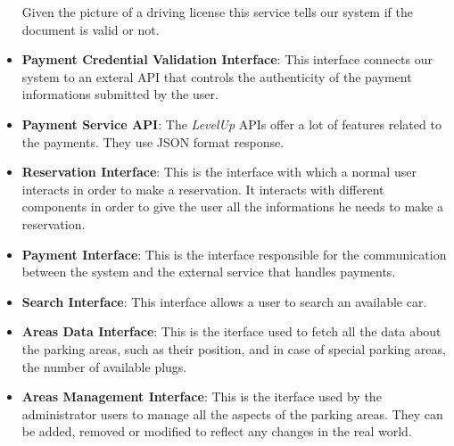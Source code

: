 \begin{itemize}
                                 Given the picture of a driving license this
                                 service tells our system if the document is
                                 valid or not.
  \item \textbf{Payment Credential Validation Interface}: This interface
                                 connects our system to an exteral API that
                                 controls the authenticity of the payment
                                 informations submitted by the user.
  \item \textbf{Payment Service API}: The \textit{LevelUp} APIs offer a lot of
                                      features related to the payments. They
                                      use JSON format response.
  \item \textbf{Reservation Interface}: This is the interface with which a
                                        normal user interacts in order to make a
                                        reservation. It interacts with different
                                        components in order to give the user all
                                        the informations he needs to make a
                                        reservation.
  \item \textbf{Payment Interface}: This is the interface responsible for the
                                    communication between the system and the
                                    external service that handles payments.
  \item \textbf{Search Interface}: This interface allows a user to search an
                                   available car.
  \item \textbf{Areas Data Interface}: This is the iterface used to fetch all
                                       the data about the parking areas, such as
                                       their position, and in case of special
                                       parking areas, the number of available
                                       plugs.
  \item \textbf{Areas Management Interface}: This is the iterface used by the
                                             administrator users to manage all
                                             the aspects of the parking areas.
                                             They can be added, removed or
                                             modified to reflect any changes in
                                             the real world.

\end{itemize}
